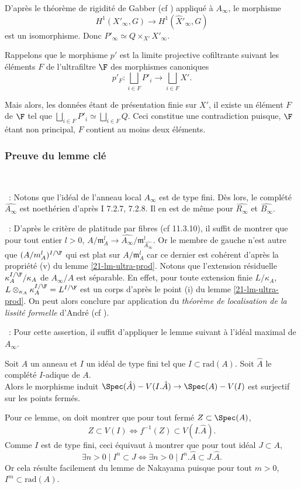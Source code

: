 \documentclass[10pt]{../fichiers-configuration-latex/smfart}
\begin{document}
D'après le théorème de rigidité de Gabber (cf \cite{})
appliqué à $A_\infty$, le morphisme
$$
H^1(X'_\infty,G) \rightarrow H^1(\hat X'_\infty,G)
$$
est un isomorphisme. 
Donc $P'_\infty  \simeq Q \times_{X'} X'_\infty$.

Rappelons que le morphisme $p'$
est la limite projective cofiltrante
suivant les éléments $F$ de l'ultrafiltre $\F$
des morphismes canoniques
$$
p'_F:\bigsqcup_{i \in F} P'_i \rightarrow \bigsqcup_{i \in F} X'.
$$

Mais alors, les données étant de présentation finie sur $X'$,
 il existe un élément $F$ de $\F$ tel que
  $\bigsqcup_{i \in F} P'_i \simeq \bigsqcup_{i \in F} Q$.
Ceci constitue une contradiction puisque, $\F$ étant non principal,
 $F$ contient au moins deux éléments.

\subsubsection{Preuve du lemme clé}~

\medskip

~:
Notons que l'idéal de l'anneau local $A_\infty$ est de type
fini. Dès lors, le complété $\widehat{A_\infty}$ est noethérien
d'après \isoegazero I {7.2.7, 7.2.8}.
Il en est de même pour $\widehat{R_\infty}$ et $\widehat{B_\infty}$.

\medskip

~:
D'après le critère de platitude par fibres (cf  {11.3.10}),
 il suffit de montrer que pour tout entier $l>0$,
  $A/\mathfrak{m}_A^l \rightarrow \widehat{A_\infty}/\mathfrak{m}_{\widehat{A_\infty}}^l$.
Or le membre de gauche n'est autre que $(A/\mathfrak{m}_A^l)^{I/\F}$
 qui est plat sur $A/\mathfrak{m}_A^l$ car ce dernier est cohérent
d'après la propriété (v) du lemme \ref{21-lm-ultra-prod}.
Notons que l'extension résiduelle $\kappa_A^{I/\F}/\kappa_A$ 
de $A_\infty/A$ est séparable. En effet,
 pour toute extension finie $L/\kappa_A$,
 $L \otimes_{\kappa_A} \kappa_A^{I/\F}=L^{I/\F}$ est un corps
  d'après le point (i) du lemme \ref{21-lm-ultra-prod}.
On peut alors conclure par application du 
{\it théorème de localisation de la lissité formelle}
d'André (cf \cite{Localisation@Andre}).

\medskip

~:
Pour cette assertion,
il suffit d'appliquer le lemme suivant
à l'idéal maximal de $A_\infty$.
\begin{lemme}
Soit $A$ un anneau et $I$ un idéal de type fini tel que
 $I \subset \mathrm{rad}(A)$. 
Soit $\hat A$ le complété $I$-adique de $A$. \\
Alors le morphisme induit
 $\Spec(\hat A)-V(I.\hat A) \rightarrow \Spec(A)-V(I)$
est surjectif sur les points fermés.
\end{lemme}
Pour ce lemme, on doit montrer que pour tout fermé 
$Z \subset \Spec(A)$,
$$
Z \subset V(I) \Leftrightarrow f^{-1}(Z) \subset V(I.\hat A).
$$
Comme $I$ est de type fini, ceci équivaut à montrer que pour 
tout idéal $J \subset A$,
$$
\exists n>0 \mid I^n \subset J
  \Leftrightarrow
\exists n>0 \mid I^n.\hat A \subset J.\hat A.
$$
Or cela résulte facilement du lemme de Nakayama
puisque pour tout $m>0$, $I^m \subset \mathrm{rad}(A)$.
\end{document}
